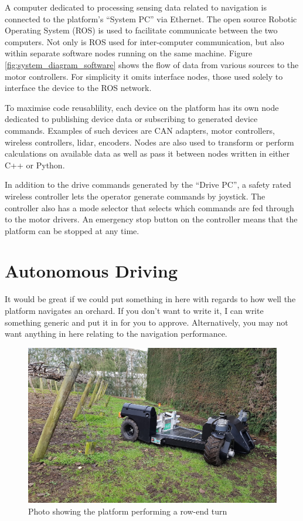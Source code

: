 \documentclass[preprint,authoryear,12pt]{elsarticle}
\begin{document}
    A computer dedicated to processing sensing data related to navigation is connected to the platform's ``System PC'' via Ethernet.
    The open source Robotic Operating System (ROS) is used to facilitate communicate between the two computers.
    Not only is ROS used for inter-computer communication, but also within separate software nodes running on the same machine.
    Figure \ref{fig:system_diagram_software} shows the flow of data from various sources to the motor controllers.
    For simplicity it omits interface nodes, those used solely to interface the device to the ROS network.

    To maximise code reusablility, each device on the platform has its own node dedicated to publishing device data or subscribing to generated device commands.
    Examples of such devices are CAN adapters, motor controllers, wireless controllers, lidar, encoders.
    Nodes are also used to transform or perform calculations on available data as well as pass it between nodes written in either C++ or Python.

    In addition to the drive commands generated by the ``Drive PC'', a safety rated wireless controller lets the operator generate commands by joystick.
    The controller also has a mode selector that selects which commands are fed through to the motor drivers.
    An emergency stop button on the controller means that the platform can be stopped at any time.


\section{Autonomous Driving}
\label{sect:autonomous}
    \color{red}
        It would be great if we could put something in here with regards to how well the platform navigates an orchard.
        If you don't want to write it, I can write something generic and put it in for you to approve.
        Alternatively, you may not want anything in here relating to the navigation performance.
    \color{black}
    \begin{figure}[htb]
        \centering
        \includegraphics[width=\linewidth]{imgs/photos/suzy_turning.jpg}
        \caption{
            Photo showing the platform performing a row-end turn
        }
        \label{fig:suzy_turning}
    \end{figure}
\end{document}
